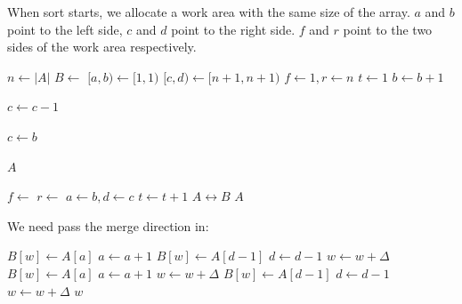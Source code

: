 \documentclass[b5paper]{article}
\begin{document}
When sort starts, we allocate a work area with the same size of the array. $a$ and $b$ point to the left side, $c$ and $d$ point to the right side. $f$ and $r$ point to the two sides of the work area respectively.

\begin{algorithmic}[1]
    \State $n \gets |A|$
    \State $B \gets$   
    \Loop
      \State $[a, b) \gets [1, 1)$
      \State $[c, d) \gets [n+1, n+1)$
      \State $f \gets 1, r \gets n$ 
      \State $t \gets 1$            
                     
        \Repeat \Comment{Span $[a, b)$}
          \State $b \gets b + 1$

        \Repeat \Comment{Span $[c, d)$}
          \State $c \gets c - 1$

         
          \State $c \gets b$
        \EndIf

         \Comment{Terminates if $[a, b)$ spans the whole array}
          \State \Return $A$
        \EndIf

         
          \State $f \gets$ \Call{Merge}{$A, [a, b), [c, d), B, f, 1$}
        \Else {}
          \State $r \gets$ \Call{Merge}{$A, [a, b), [c, d), B, r, -1$}
        \EndIf
        \State $a \gets b, d \gets c$
        \State $t \gets t + 1$
      \EndWhile
      \State {} $A \leftrightarrow B$ 
    \EndLoop
  \EndIf
  \State \Return $A$
\EndFunction
\end{algorithmic}

We need pass the merge direction in:

\begin{algorithmic}[1]
\Function{Merge}{$A, [a, b), [c, d), B, w, \Delta$}
      \State $B[w] \gets A[a]$
      \State $a \gets a + 1$
    \Else
      \State $B[w] \gets A[d-1]$
      \State $d \gets d - 1$
    \EndIf
    \State $w \gets w + \Delta$
  \EndWhile
    \State $B[w] \gets A[a]$
    \State $a \gets a + 1$
    \State $w \gets w + \Delta$
  \EndWhile
    \State $B[w] \gets A[d-1]$
    \State $d \gets d - 1$
    \State $w \gets w + \Delta$
  \EndWhile
  \State \Return $w$
\EndFunction
\end{algorithmic}
\end{document}
